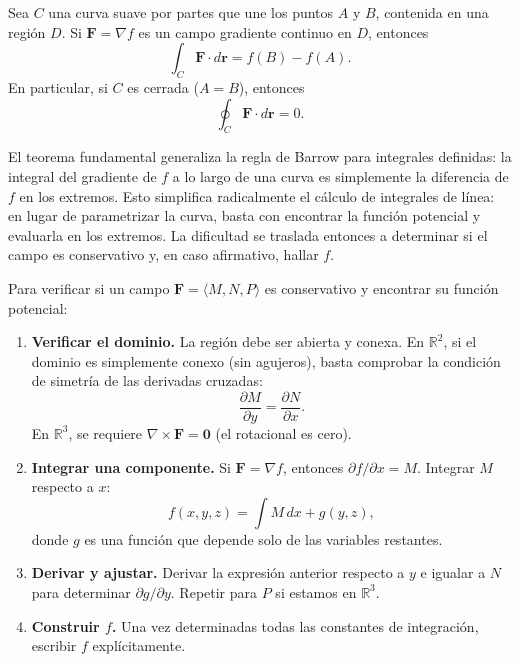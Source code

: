 \begin{theorem}
Sea $C$ una curva suave por partes que une los puntos $A$ y $B$,
contenida en una región $D$. Si $\mathbf{F} = \nabla f$ es un campo
gradiente continuo en $D$, entonces
\[
\int_C \mathbf{F} \cdot d\mathbf{r} = f(B) - f(A).
\]
En particular, si $C$ es cerrada ($A=B$), entonces
\[
\oint_C \mathbf{F} \cdot d\mathbf{r} = 0.
\]
\end{theorem}

\begin{rem}
El teorema fundamental generaliza la regla de Barrow para integrales
definidas: la integral del gradiente de $f$ a lo largo de una curva
es simplemente la diferencia de $f$ en los extremos. Esto simplifica
radicalmente el cálculo de integrales de línea: en lugar de parametrizar
la curva, basta con encontrar la función potencial y evaluarla en los
extremos. La dificultad se traslada entonces a determinar si el campo
es conservativo y, en caso afirmativo, hallar $f$.
\end{rem}

\begin{pasos}
Para verificar si un campo $\mathbf{F}=\langle M,N,P \rangle$ es
conservativo y encontrar su función potencial:
\begin{enumerate}
    \item \textbf{Verificar el dominio.} La región debe ser abierta y
    conexa. En $\mathbb{R}^2$, si el dominio es simplemente conexo
    (sin agujeros), basta comprobar la condición de simetría de las
    derivadas cruzadas:
    \[
    \frac{\partial M}{\partial y} = \frac{\partial N}{\partial x}.
    \]
    En $\mathbb{R}^3$, se requiere $\nabla \times \mathbf{F} = \mathbf{0}$
    (el rotacional es cero).
    \item \textbf{Integrar una componente.} Si $\mathbf{F} = \nabla f$,
    entonces $\partial f/\partial x = M$. Integrar $M$ respecto a $x$:
    \[
    f(x,y,z) = \int M\,dx + g(y,z),
    \]
    donde $g$ es una función que depende solo de las variables
    restantes.
    \item \textbf{Derivar y ajustar.} Derivar la expresión anterior
    respecto a $y$ e igualar a $N$ para determinar $\partial g/\partial y$.
    Repetir para $P$ si estamos en $\mathbb{R}^3$.
    \item \textbf{Construir $f$.} Una vez determinadas todas las
    constantes de integración, escribir $f$ explícitamente.
\end{enumerate}
\end{pasos}

